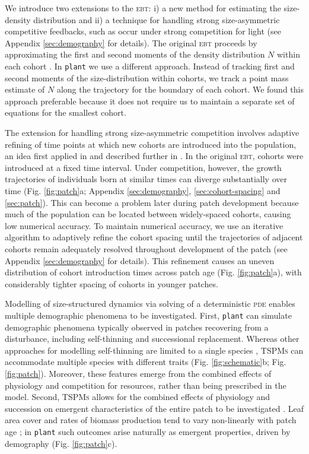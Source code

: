 \documentclass[a4paper,11pt]{article}
\newcommand{\plant}{\texttt{plant}}
\begin{document}
We introduce two extensions to the \textsc{ebt}: i) a new method for
estimating the size-density distribution and ii) a technique for
handling strong size-asymmetric competitive feedbacks, such as occur
under strong competition for light (see Appendix \ref{sec:demography}
for details). The original \textsc{ebt} proceeds by approximating the
first and second moments of the density distribution \(N\) within each
cohort \citep{Deroos-1997}.
%
In {\plant} we use a different approach. Instead of tracking first and
second moments of the size-distribution within cohorts, we track a
point mass estimate of \(N\) along the trajectory for the boundary of
each cohort. We found this approach preferable because it does not
require us to maintain a separate set of equations for the smallest
cohort.

The extension for handling strong size-asymmetric competition involves
adaptive refining of time points at which new cohorts are introduced
into the population, an idea first applied in \citet{Falster-2011} and
described further in \citet{Falster-2015}.
In the original \textsc{ebt}, cohorts were introduced at a fixed time
interval. Under competition, however, the growth
trajectories of individuals born at similar times can diverge
substantially over time (Fig. \ref{fig:patch}a; Appendix
\ref{sec:demography}, \ref{sec:cohort-spacing} and
\ref{sec:patch}). This can become a problem later during patch
development because much of the population can be located between
widely-spaced cohorts, causing low numerical accuracy. To maintain
numerical accuracy, we use an iterative algorithm to adaptively refine
the cohort spacing until the trajectories of adjacent cohorts remain
adequately resolved throughout development of the patch (see Appendix
\ref{sec:demography} for details). This refinement causes an uneven
distribution of cohort introduction times across patch age (Fig.
\ref{fig:patch}a), with considerably tighter spacing of cohorts in
younger patches.

Modelling of size-structured dynamics via solving of a deterministic
\textsc{pde} enables multiple demographic phenomena to be
investigated. First, {\plant} can simulate demographic
phenomena typically observed in patches
recovering from a disturbance, including self-thinning and
successional replacement. Whereas other approaches for modelling
self-thinning are limited to a single species
\citep[e.g.][]{Barnes-2004, Coomes-2007}, \textsc{TSPMs} can accommodate
multiple species with different traits (Fig. \ref{fig:schematic}b;
Fig.  \ref{fig:patch}). Moreover, these features emerge from the
combined effects of physiology and competition for resources, rather
than being prescribed in the model. Second, \textsc{TSPMs} allows for
the combined effects of physiology and succession on emergent
characteristics of the entire patch to be investigated
\citep{Moorcroft-2001, Falster-2011}. Leaf area cover and rates of biomass
production tend to vary  non-linearly with patch
age \citep{Smith-2001, Binkley-2002, Ogawa-2010};
in {\plant} such outcomes arise naturally as emergent properties,
driven by demography (Fig. \ref{fig:patch}c).
\end{document}
